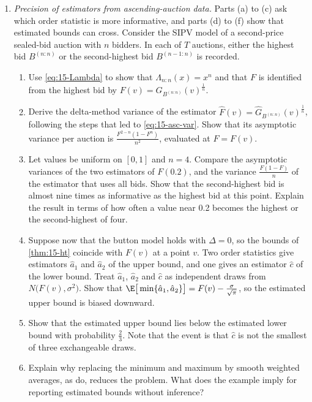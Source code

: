 \begin{enumerate}[label=\arabic*., leftmargin=*, itemsep=6pt]

\item \textit{Precision of estimators from ascending-auction data.} Parts (a) to (c) ask which order statistic
is more informative, and parts (d) to (f) show that estimated bounds can cross. Consider the SIPV model of a
second-price sealed-bid auction with $n$ bidders. In each of $T$ auctions, either the highest bid
$B^{(n:n)}$ or the second-highest bid $B^{(n-1:n)}$ is recorded.
\begin{enumerate}[label=(\alph*)]
  \item Use \eqref{eq:15-Lambda} to show that $\Lambda_{n:n}(x)=x^n$ and that $F$ is identified from the highest
  bid by $F(v)=G_{B^{(n:n)}}(v)^{\frac1n}$.
  \item Derive the delta-method variance of the estimator $\hat F(v)=\hat G_{B^{(n:n)}}(v)^{\frac1n}$, following
  the steps that led to \eqref{eq:15-asc-var}. Show that its asymptotic variance per auction is
  $\frac{F^{2-n}(1-F^n)}{n^2}$, evaluated at $F=F(v)$.
  \item Let values be uniform on $[0,1]$ and $n=4$. Compare the asymptotic variances of the two estimators of
  $F(0.2)$, and the variance $\frac{F(1-F)}{n}$ of the estimator that uses all bids. Show that the
  second-highest bid is almost nine times as informative as the highest bid at this point. Explain the result
  in terms of how often a value near 0.2 becomes the highest or the second-highest of four.
  \item Suppose now that the button model holds with $\Delta=0$, so the bounds of \cref{thm:15-ht} coincide
  with $F(v)$ at a point $v$. Two order statistics give estimators $\hat a_1$ and $\hat a_2$ of the upper bound,
  and one gives an estimator $\hat c$ of the lower bound. Treat $\hat a_1$, $\hat a_2$ and $\hat c$ as
  independent draws from $N\big(F(v),\sigma^2\big)$. Show that
  $\E\big[\min\{\hat a_1,\hat a_2\}\big]=F(v)-\frac{\sigma}{\sqrt\pi}$, so the estimated upper bound is biased
  downward.
  \item Show that the estimated upper bound lies below the estimated lower bound with probability
  $\frac23$. Note that the event is that $\hat c$ is not the smallest of three exchangeable draws.
  \item Explain why replacing the minimum and maximum by smooth weighted averages, as
  \citet{HaileTamer2003} do, reduces the problem. What does the example imply for reporting estimated bounds
  without inference?
\end{enumerate}


\end{enumerate}
